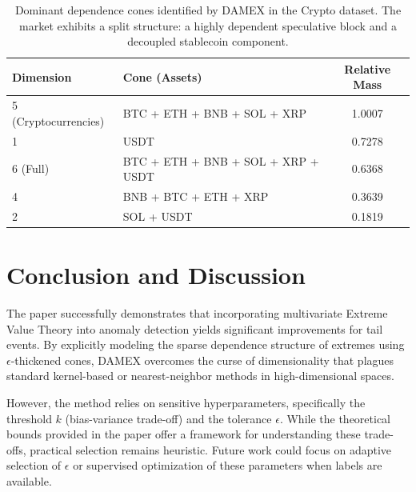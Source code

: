 \documentclass[11pt]{article}
\begin{document}
\begin{table}[h]
    \centering
    \begin{tabular}{llc}
        \toprule
        \textbf{Dimension} & \textbf{Cone (Assets)} & \textbf{Relative Mass} \\
        \midrule
        5 (Cryptocurrencies) & BTC + ETH + BNB + SOL + XRP & 1.0007 \\
        1 & USDT & 0.7278 \\
        6 (Full) & BTC + ETH + BNB + SOL + XRP + USDT & 0.6368 \\
        4 & BNB + BTC + ETH + XRP & 0.3639 \\
        2 & SOL + USDT & 0.1819 \\
        \bottomrule
    \end{tabular}
    \caption{Dominant dependence cones identified by DAMEX in the Crypto dataset. The market exhibits a split structure: a highly dependent speculative block and a decoupled stablecoin component.}
    \label{tab:crypto_results}
\end{table}


\section{Conclusion and Discussion}
The paper successfully demonstrates that incorporating multivariate Extreme Value Theory into anomaly detection yields significant improvements for tail events. By explicitly modeling the sparse dependence structure of extremes using $\epsilon$-thickened cones, DAMEX overcomes the curse of dimensionality that plagues standard kernel-based or nearest-neighbor methods in high-dimensional spaces.

However, the method relies on sensitive hyperparameters, specifically the threshold $k$ (bias-variance trade-off) and the tolerance $\epsilon$. While the theoretical bounds provided in the paper offer a framework for understanding these trade-offs, practical selection remains heuristic. Future work could focus on adaptive selection of $\epsilon$ or supervised optimization of these parameters when labels are available.




\newpage
\appendix
\end{document}
